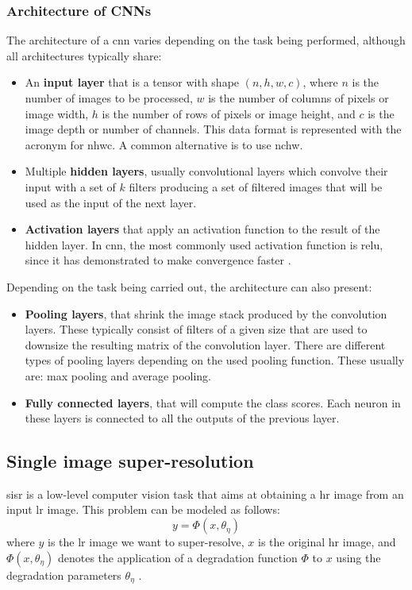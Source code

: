 \subsubsection*{Architecture of CNNs}
The architecture of a \gls{cnn} varies depending on the task being performed, although all architectures typically share:
\begin{itemize}
	\item An \textbf{input layer} that is a tensor with shape 
	$(n, h, w, c)$, where $n$ is the number of images to be processed, $w$ is the number of columns of pixels or image width, $h$ is the number of rows of pixels or image height, and $c$ is the image depth or number of channels. This data format is represented with the acronym for \gls{nhwc}. A common alternative is to use \gls{nchw}.
	\item Multiple \textbf{hidden layers}, usually convolutional layers which convolve their input with a set of $k$ filters producing a set of filtered images that will be used as the input of the next layer.
	\item \textbf{Activation layers} that apply an activation function to the result of the hidden layer. In \gls{cnn}, the most commonly used activation function is \gls{relu}, since it has demonstrated to make convergence faster \cite{RELU}.
\end{itemize}

Depending on the task being carried out, the architecture can also present:
\begin{itemize}
	\item \textbf{Pooling layers}, that shrink the image stack produced by the convolution layers. These typically consist of filters of a given size that are used to downsize the resulting matrix of the convolution layer. There are different types of pooling layers depending on the used pooling function. These usually are: max pooling and average pooling.
	\item \textbf{Fully connected layers}, that will compute the class scores. Each neuron in these layers is connected to all the outputs of the previous layer.
\end{itemize}

\subsection{Single image super-resolution}

\gls{sisr} is a low-level computer vision task that aims at obtaining a \gls{hr} image from an input \gls{lr} image. This problem can be modeled as follows:
$$y = \Phi(x, \theta_\eta)$$
where $y$ is the \gls{lr} image we want to super-resolve, $x$ is the original \gls{hr} image, and $\Phi(x, \theta_\eta)$ denotes the application of a degradation function $\Phi$ to $x$ using the degradation parameters $\theta_\eta$ \cite{DBLP:SISR}. 


